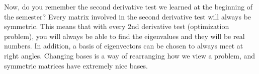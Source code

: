 Now, do you remember the second derivative test we learned at the beginning of the semester?  Every matrix involved in the second derivative test will always be symmetric.  This means that with every 2nd derivative test (optimization problem), you will always be able to find the eigenvalues and they will be real numbers.  
In addition, a basis of eigenvectors can be chosen to always meet at right angles. 
Changing bases is a way of rearranging how we view a problem, and symmetric matrices have extremely nice bases. 








